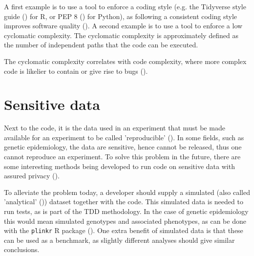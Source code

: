 
A first example is to use a tool to enforce a coding style 
(e.g. the Tidyverse style guide (\cite{wickham2019advanced}) for R,
or PEP 8 (\cite{van2001pep}) for Python),
as following a consistent coding style improves software quality (\cite{fang2001}).
A second example is to use a tool to enforce a low cyclomatic complexity.
The cyclomatic complexity is approximately defined 
as the number of independent paths that
the code can be executed. 

The cyclomatic complexity correlates with code complexity,
where more complex code is likelier to contain or give rise to bugs 
(\cite{abd2018calculating,chen2019empirical,zimmermann2008predicting}).

\section{Sensitive data}\label{sec:sensitive-data}

Next to the code, it is the data used in an experiment 
that must be made available for an experiment 
to be called 'reproducible' (\cite{peng2006reproducible}).
In some fields, such as genetic epidemiology, the data are
sensitive, hence cannot be released, thus one cannot reproduce 
an experiment.
To solve this problem in the future, there are some 
interesting methods being developed to run code on sensitive
data with assured privacy (\cite{zhang2016review,azencott2018machine}).

To alleviate the problem today,
a developer should supply a simulated 
(also called 'analytical' (\cite{peng2006reproducible})) dataset
together with the code.
This simulated data is needed to run tests, as is 
part of the TDD methodology.
In the case of genetic epidemiology this would mean
simulated genotypes and associated phenotypes,
as can be done with the \verb|plinkr| R package (\cite{plinkr}).
One extra benefit of simulated data is that these can be used
as a benchmark, as slightly different analyses should give 
similar conclusions.

